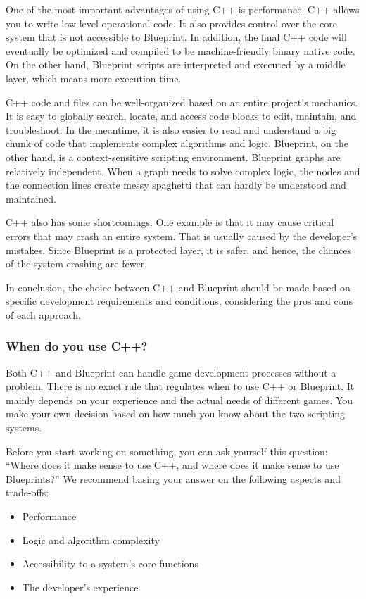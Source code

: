 \documentclass[11pt]{article} %
\begin{document}
One of the most important advantages of using C++ is performance. C++ allows you to write low-level operational code. It also provides control over the core system that is not accessible to Blueprint. In addition, the final C++ code will eventually be optimized and compiled to be machine-friendly binary native code. On the other hand, Blueprint scripts are interpreted and executed by a middle layer, which means more execution time.

C++ code and files can be well-organized based on an entire project’s mechanics. It is easy to globally search, locate, and access code blocks to edit, maintain, and troubleshoot. In the meantime, it is also easier to read and understand a big chunk of code that implements complex algorithms and logic. Blueprint, on the other hand, is a context-sensitive scripting environment. Blueprint graphs are relatively independent. When a graph needs to solve complex logic, the nodes and the connection lines create messy spaghetti that can hardly be understood and maintained.

C++ also has some shortcomings. One example is that it may cause critical errors that may crash an entire system. That is usually caused by the developer’s mistakes. Since Blueprint is a protected layer, it is safer, and hence, the chances of the system crashing are fewer.

In conclusion, the choice between C++ and Blueprint should be made based on specific development requirements and conditions, considering the pros and cons of each approach.

\subsubsection*{When do you use C++?}

Both C++ and Blueprint can handle game development processes without a problem. There is no exact rule that regulates when to use C++ or Blueprint. It mainly depends on your experience and the actual needs of different games. You make your own decision based on how much you know about the two scripting systems.

Before you start working on something, you can ask yourself this question: “Where does it make sense to use C++, and where does it make sense to use Blueprints?” We recommend basing your answer on the following aspects and trade-offs:

\begin{itemize}
\item Performance
\item Logic and algorithm complexity
\item Accessibility to a system’s core functions
\item The developer’s experience
\end{itemize}
\end{document}
